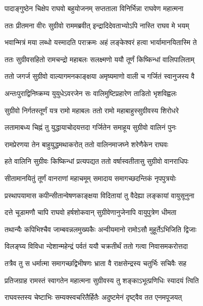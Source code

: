 \twolineshloka
{पादाङ्गुष्ठेन चिक्षेप राघवो बहुयोजनम्}
{सप्तताला विनिर्भिन्ना राघवेण महात्मना}%

\twolineshloka
{ततः प्रीतमना वीरः सुग्रीवो राममब्रवीत्}
{इन्द्रादिदेवताभ्योऽपि नास्ति राघव मे भयम्}%

\twolineshloka
{भवान्मित्रं मया लब्धो यस्मादति पराक्रमः}
{अहं लङ्केश्वरं हत्वा भार्यामानयितास्मि ते}%

\twolineshloka
{ततः सुग्रीवसहितो रामचन्द्रो महाबलः}
{सलक्ष्मणो ययौ तूर्णं किष्किन्धां वालिपालिताम्}%

\twolineshloka
{ततो जगर्ज सुग्रीवो वाल्यागमनकाङ्क्षया}
{अमृष्यमाणो वाली च गर्जितं स्वानुजस्य वै}%

\twolineshloka
{अन्तःपुराद्विनिष्क्रम्य युयुधेऽवरजेन सः}
{वालिमुष्टिप्रहारेण ताडितो भृशविह्वलः}%

\twolineshloka
{सुग्रीवो निर्गतस्तूर्णं यत्र रामो महाबलः}
{ततो रामो महाबाहुस्सुग्रीवस्य शिरोधरे}%

\twolineshloka
{लतामाबध्य चिह्नं तु युद्धायाचोदयत्तदा}
{गर्जितेन समाहूय सुग्रीवो वालिनं पुनः}%

\twolineshloka
{रामप्रेरणया तेन बाहुयुद्धमथाकरोत्}
{ततो वालिनमाजघ्ने शरेणैकेन राघवः}%

\twolineshloka
{हते वालिनि सुग्रीवः किष्किन्धां प्रत्यपद्यत}
{ततो वर्षास्वतीतासु सुग्रीवो वानराधिपः}%

\twolineshloka
{सीतामानयितुं तूर्णं वानराणां महाचमूम्}
{समादाय समागच्छदन्तिकं नृपपुत्रयोः}%

\twolineshloka
{प्रस्थापयामास कपीन्सीतान्वेषणकाङ्क्षया}
{विदितायां तु वैदेह्या लङ्कायां वायुसूनुना}%

\twolineshloka
{दत्ते चूडामणौ चापि राघवो हर्षशोकवान्}
{सुग्रीवेणानुजेनापि वायुपुत्रेण धीमता}%

\twolineshloka
{तथान्यैः कपिभिश्चैव जाम्बवन्नलमुख्यकैः}
{अन्वीयमानो रामोऽसौ मुहूर्तेऽभिजिति द्विजाः}%

\twolineshloka
{विलङ्घ्य विविधा न्देशान्महेन्द्रं पर्वतं ययौ}
{चक्रतीर्थं ततो गत्वा निवासमकरोत्तदा}%

\twolineshloka
{तत्रैव तु स धर्मात्मा समागच्छद्विभीषणः}
{भ्राता वै राक्षसेन्द्रस्य चतुर्भिः सचिवैः सह}%

\twolineshloka
{प्रतिजग्राह रामस्तं स्वागतेन महात्मना}
{सुग्रीवस्य तु शङ्काऽभूत्प्रणिधिः स्यादयं त्विति}%

\twolineshloka
{राघवस्तस्य चेष्टाभिः सम्यक्स्वचरितैर्हितैः}
{अदुष्टमेनं दृष्ट्वैव तत एनमपूजयत्}%

